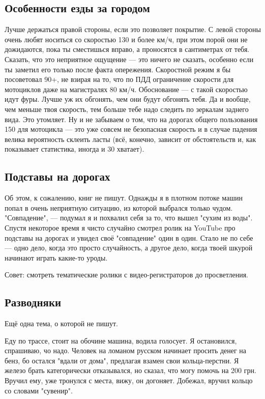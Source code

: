 \documentclass[12pt,a4paper]{article}
\begin{document}
\subsection{Особенности езды за городом}

Лучше держаться правой стороны, если это позволяет покрытие.
С левой стороны очень любят носиться со скоростью 130 и более км/ч,
при этом порой они не дожидаются, пока ты сместишься вправо, а
проносятся в сантиметрах от тебя. Сказать, что это неприятное ощущение ---
это ничего не сказать, особенно если ты заметил его только после факта
опережения. Скоростной режим я бы посоветовал 90+, не взирая на то,
что по ПДД ограничение скорости для мотоциклов даже на магистралях
80 км/ч. Обоснование --- с такой скоростью идут фуры. Лучше уж их обгонять,
чем они будут обгонять тебя. Да и вообще, чем меньше твоя скорость,
тем больше тебе надо следить по зеркалам заднего вида. Это утомляет.
Ну и не забываем о том, что на дорогах общего пользования 150 для
мотоцикла --- это уже совсем не безопасная скорость и в случае
падения велика вероятность склеить ласты (всё, конечно, зависит от
обстоятельств и, как показывает статистика, иногда и 30 хватает).

\subsection{Подставы на дорогах}

Об этом, к сожалению, книг не пишут. Однажды я в плотном потоке
машин попал в очень неприятную ситуацию, из которой выбрался только
чудом. "Совпадение", --- подумал я и похвалил себя за то, что вышел
"сухим из воды". Спустя некоторое время я чисто случайно смотрел
ролик на YouTube про подставы на дорогах и увидел своё "совпадение"
один в один. Стало не по себе --- одно дело, когда это просто
случайность, а другое дело, когда твоей шкурой начинают играть
какие-то уроды.

Совет: смотреть тематические ролики с видео-регистраторов до
просветления.

\subsection{Разводняки}

Ещё одна тема, о которой не пишут.

Еду по трассе, стоит на обочине машина, водила голосует.
Я остановился, спрашиваю, чо надо. Человек на ломаном русском
начинает просить денег на бенз, бо остался "вдали от дома", предлагая
взамен свои кольца-перстни. Я железо брать категорически отказывался,
но сказал, что могу помочь на 200 грн. Вручил ему, уже тронулся с
места, вижу, он догоняет. Добежал, вручил кольцо со словами "сувенир".
\end{document}
